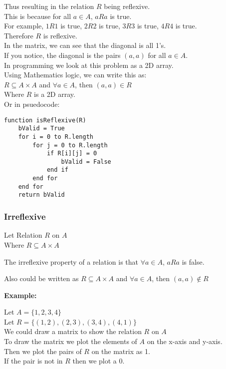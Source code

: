 Thus resulting in the relation $R$ being reflexive. \\
This is because for all $a \in A$, $aRa$ is true. \\
For example, $1R1$ is true, $2R2$ is true, $3R3$ is true, $4R4$ is true. \\
Therefore $R$ is reflexive. \\

In the matrix, we can see that the diagonal is all 1's. \\
If you notice, the diagonal is the pairs $(a,a)$ for all $a \in A$. \\
In programming we look at this problem as a 2D array. \\

Using Mathematics logic, we can write this as: \\
$R \subseteq A \times A$ and $\forall a \in A$, then $(a,a) \in R$ \\

Where $R$ is a 2D array. \\

Or in psuedocode: \\

\begin{lstlisting}
function isReflexive(R)
    bValid = True
    for i = 0 to R.length
        for j = 0 to R.length
            if R[i][j] = 0 
                bValid = False
            end if
        end for
    end for                    
    return bValid
\end{lstlisting}

\subsubsection{Irreflexive}
Let Relation $R$ on $A$ \\
Where $R \subseteq A \times A$

The irreflexive property of a relation is that $\forall a \in A$, $aRa$ is false.

Also could be written as $R \subseteq A \times A$ and $\forall a \in A$, then $(a,a) \notin R$

\textbf{Example:}

Let $A = \{1,2,3,4\}$ \\
Let $R = \{(1,2),(2,3),(3,4),(4,1)\}$ \\
We could draw a matrix to show the relation $R$ on $A$ \\
To draw the matrix we plot the elements of $A$ on the x-axis and y-axis. \\
Then we plot the pairs of $R$ on the matrix as 1. \\
If the pair is not in $R$ then we plot a 0. \\


